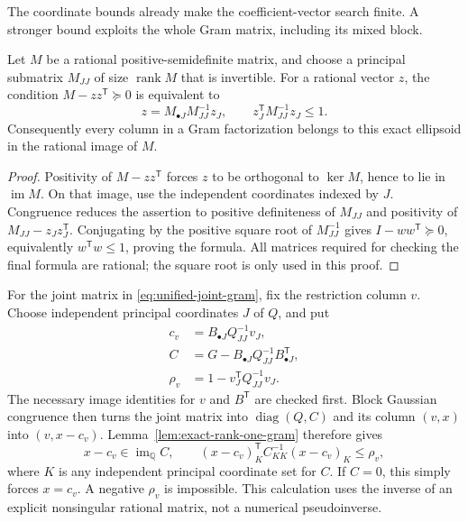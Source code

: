 The coordinate bounds already make the coefficient-vector search finite.
A stronger bound exploits the whole Gram matrix, including its mixed block.

\begin{lemma}
\label{lem:exact-rank-one-gram}
Let $M$ be a rational positive-semidefinite matrix, and choose a principal
submatrix $M_{JJ}$ of size $\operatorname{rank}M$ that is invertible.
For a rational vector $z$, the condition $M-zz^{\mathsf T}\succeq0$ is
equivalent to
\[
 z=M_{\bullet J}M_{JJ}^{-1}z_J,
 \qquad z_J^{\mathsf T}M_{JJ}^{-1}z_J\le1.
\]
Consequently every column in a Gram factorization belongs to this exact
ellipsoid in the rational image of $M$.
\end{lemma}
\begin{proof}
Positivity of $M-zz^{\mathsf T}$ forces $z$ to be orthogonal to
$\ker M$, hence to lie in $\operatorname{im}M$. On that image, use the
independent coordinates indexed by $J$. Congruence reduces the assertion
to positive definiteness of $M_{JJ}$ and positivity of
$M_{JJ}-z_Jz_J^{\mathsf T}$. Conjugating by the positive square root of
$M_{JJ}^{-1}$ gives $I-ww^{\mathsf T}\succeq0$, equivalently
$w^{\mathsf T}w\le1$, proving the formula.
All matrices required for checking the final formula are rational; the
square root is only used in this proof.
\end{proof}

For the joint matrix in \eqref{eq:unified-joint-gram}, fix the restriction
column $v$. Choose independent principal coordinates $J$ of $Q$, and put
\begin{equation}\label{eq:word-Schur-domain}
 \begin{split}
 c_v&=B_{\bullet J}Q_{JJ}^{-1}v_J,\\
 C&=G-B_{\bullet J}Q_{JJ}^{-1}B_{\bullet J}^{\mathsf T},\\
 \rho_v&=1-v_J^{\mathsf T}Q_{JJ}^{-1}v_J.
 \end{split}
\end{equation}
The necessary image identities for $v$ and $B^{\mathsf T}$ are checked
first. Block Gaussian congruence then turns the joint matrix into
$\operatorname{diag}(Q,C)$ and its column $(v,x)$ into $(v,x-c_v)$.
Lemma~\ref{lem:exact-rank-one-gram} therefore gives
\[
 x-c_v\in\operatorname{im}_{\mathbb Q}C,
 \qquad
 (x-c_v)_K^{\mathsf T}C_{KK}^{-1}(x-c_v)_K\le\rho_v,
\]
where $K$ is any independent principal coordinate set for $C$.
If $C=0$, this simply forces $x=c_v$. A negative $\rho_v$ is impossible.
This calculation uses the inverse of an explicit nonsingular rational
matrix, not a numerical pseudoinverse.

